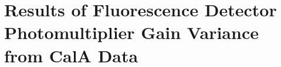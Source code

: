 \chapter[Results of FD PMT Gain Variance from CalA Data]{\centering Results of Fluorescence Detector Photomultiplier Gain Variance from CalA Data \\}\label{Ch:GainVariance_Results}
